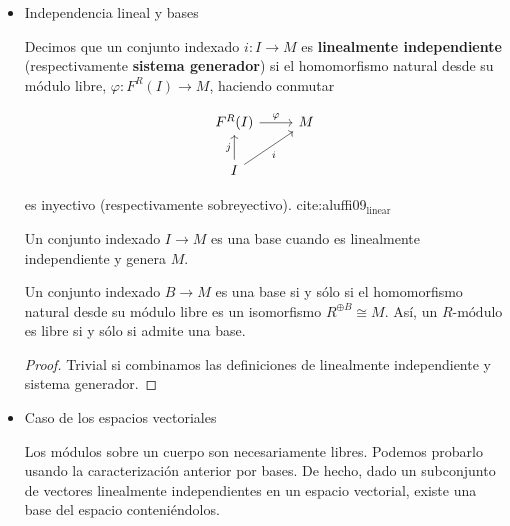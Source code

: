 \documentclass[11pt]{article}
\begin{document}
\begin{itemize}
\begin{itemize}
\begin{proof}
además de forma única y en un número finito de sumandos, uno para cada
elemento en el que la aplicación sea no nula. Esto que nos lleva a que,
una vez definida la imagen de cada elemento $a$, queda definida la imagen
que debe tener $\varphi$ sobre toda el anillo de forma única.
\end{proof}
\end{itemize}

\item Independencia lineal y bases
\label{sec-7-5-3-2}
\begin{definition}
Decimos que un conjunto indexado $i \colon I \to M$ es \textbf{linealmente independiente}
(respectivamente \textbf{sistema generador}) si el homomorfismo natural desde su
módulo libre, $\varphi\colon F^{R}(I) \to M$, haciendo conmutar

\[\begin{tikzcd}
F^{R}(I) \rar{\varphi} & M \\
I \uar{j}\urar[swap]{i} &
\end{tikzcd}\]

es inyectivo (respectivamente sobreyectivo). cite:aluffi09$_{\text{linear}}$
\end{definition}

\begin{definition}
Un conjunto indexado $I \to M$ es una base cuando es linealmente
independiente y genera $M$.
\end{definition}

\begin{lemma}
Un conjunto indexado $B \to M$ es una base si y sólo si el homomorfismo
natural desde su módulo libre es un isomorfismo $R^{\oplus B} \cong M$. Así, un
$R\text{-módulo}$ es libre si y sólo si admite una base.
\end{lemma}

\begin{proof}
Trivial si combinamos las definiciones de linealmente independiente y
sistema generador.
\end{proof}

\item Caso de los espacios vectoriales
\label{sec-7-5-3-3}
\begin{theorem}
Los módulos sobre un cuerpo son necesariamente libres. Podemos
probarlo usando la caracterización anterior por bases. De hecho, dado un
subconjunto de vectores linealmente independientes en un espacio
vectorial, existe una base del espacio conteniéndolos.
\end{theorem}


\end{itemize}
\end{document}
